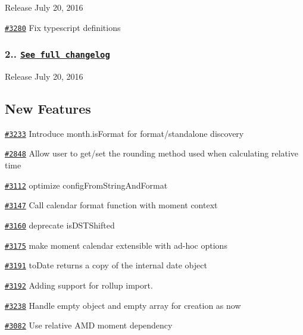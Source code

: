 \begin{DoxyItemize}
\item Release July 20, 2016
\item \href{https://github.com/moment/moment/pull/3280}{\tt \#3280} Fix typescript definitions
\end{DoxyItemize}

\subsubsection*{2.. \href{https://gist.github.com/ichernev/812e79ac36a7829a22598fe964bfc18a}{\tt See full changelog}}


\begin{DoxyItemize}
\item Release July 20, 2016
\end{DoxyItemize}

\subsection*{New Features}


\begin{DoxyItemize}
\item \href{https://github.com/moment/moment/pull/3233}{\tt \#3233} Introduce month.\+is\+Format for format/standalone discovery
\item \href{https://github.com/moment/moment/pull/2848}{\tt \#2848} Allow user to get/set the rounding method used when calculating relative time
\item \href{https://github.com/moment/moment/pull/3112}{\tt \#3112} optimize config\+From\+String\+And\+Format
\item \href{https://github.com/moment/moment/pull/3147}{\tt \#3147} Call calendar format function with moment context
\item \href{https://github.com/moment/moment/pull/3160}{\tt \#3160} deprecate is\+D\+S\+T\+Shifted
\item \href{https://github.com/moment/moment/pull/3175}{\tt \#3175} make moment calendar extensible with ad-\/hoc options
\item \href{https://github.com/moment/moment/pull/3191}{\tt \#3191} to\+Date returns a copy of the internal date object
\item \href{https://github.com/moment/moment/pull/3192}{\tt \#3192} Adding support for rollup import.
\item \href{https://github.com/moment/moment/pull/3238}{\tt \#3238} Handle empty object and empty array for creation as now
\item \href{https://github.com/moment/moment/pull/3082}{\tt \#3082} Use relative A\+MD moment dependency
\end{DoxyItemize}


